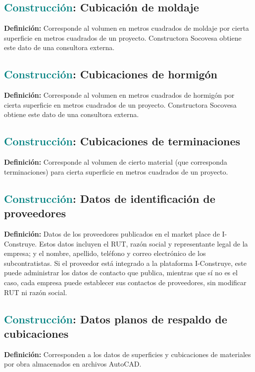 \documentclass[12pt]{article}
\begin{document}
\subsection{\textcolor{teal}{Construcción}: Cubicación de moldaje}
\textbf{Definición:} Corresponde al volumen en metros cuadrados de moldaje por cierta superficie en metros cuadrados de un proyecto. Constructora Socovesa obtiene este dato de una consultora externa.
\subsection{\textcolor{teal}{Construcción}: Cubicaciones de hormigón}
\textbf{Definición:} Corresponde al volumen en metros cuadrados de hormigón por cierta superficie en metros cuadrados de un proyecto. Constructora Socovesa obtiene este dato de una consultora externa.
\subsection{\textcolor{teal}{Construcción}: Cubicaciones de terminaciones}
\textbf{Definición:} Corresponde al volumen de cierto material (que corresponda terminaciones) para cierta superficie en metros cuadrados de un proyecto.
\subsection{\textcolor{teal}{Construcción}: Datos de identificación de proveedores}
\textbf{Definición:} Datos de los proveedores publicados en el market place de I-Construye. Estos datos incluyen el RUT, razón social y representante legal de la empresa; y el nombre, apellido, teléfono y correo electrónico de los subcontratistas. Si el proveedor está integrado a la plataforma I-Construye, este puede administrar los datos de contacto que publica, mientras que sí no es el caso, cada empresa puede establecer sus contactos de proveedores, sin modificar RUT ni razón social.
\subsection{\textcolor{teal}{Construcción}: Datos planos de respaldo de cubicaciones}
\textbf{Definición:} Corresponden a los datos de superficies y cubicaciones de materiales por obra almacenados en archivos AutoCAD.
\end{document}
